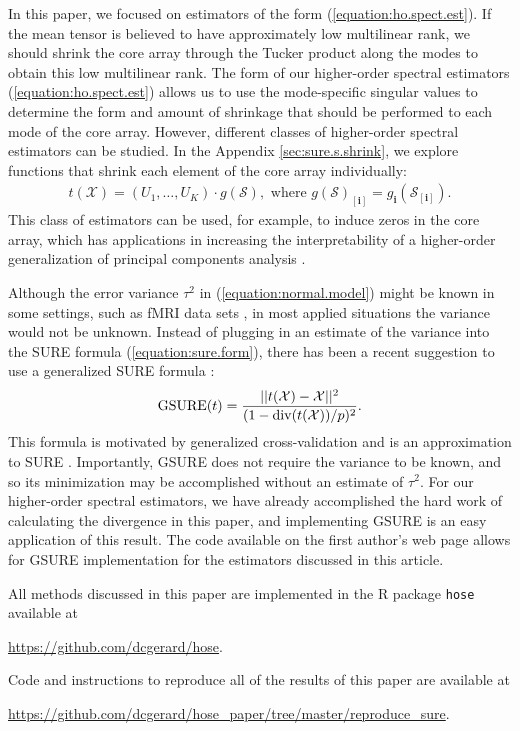 In this paper, we focused on estimators of the form
(\ref{equation:ho.spect.est}). If the mean tensor is believed to have
approximately low multilinear rank, we should shrink the core array
through the Tucker product along the modes to obtain this low
multilinear rank. The form of our higher-order spectral estimators
(\ref{equation:ho.spect.est}) allows us to use the mode-specific
singular values to determine the form and amount of shrinkage that
should be performed to each mode of the core array. However, different
classes of higher-order spectral estimators can be studied. In the
Appendix \ref{sec:sure.s.shrink}, we explore functions that shrink
each element of the core array individually:
\begin{align*}
t(\mathcal{X}) = (U_1,\ldots,U_K)\cdot g(\mathcal{S}), \text{ where } g(\mathcal{S})_{[\mathbf{i}]} = g_{\mathbf{i}}(\mathcal{S}_{[\mathbf{i}]}).
\end{align*}
This class of estimators can be used, for example, to induce zeros in
the core array, which has applications in increasing the
interpretability of a higher-order generalization of principal
components analysis
\citep{henrion1993body,kiers1997uniqueness,murakami1998case,andersson1999general,de2001independent,martin2008jacobi}.

Although the error variance $\tau^2$ in (\ref{equation:normal.model})
might be known in some settings, such as fMRI data sets
\citep{candes2013unbiased}, in most applied situations the variance
would not be unknown. Instead of plugging in an estimate of the
variance into the SURE formula (\ref{equation:sure.form}), there has
been a recent suggestion to use a generalized SURE formula
\citep{sylvain2012smooth,josse2015adaptive}:
\begin{align*}
\operatorname*{GSURE}(t) = \frac{||t(\mathcal{X}) - \mathcal{X}||^2}{(1 - \operatorname*{div}(t(\mathcal{X}))/p)^2}.
\end{align*}
This formula is motivated by generalized cross-validation
\citep{golub1979generalized} and is an approximation to SURE
\citep{josse2015adaptive}. Importantly, GSURE does not require the
variance to be known, and so its minimization may be accomplished
without an estimate of $\tau^2$. For our higher-order spectral
estimators, we have already accomplished the hard work of calculating
the divergence in this paper, and implementing GSURE is an easy
application of this result. The code available on the first author's
web page allows for GSURE implementation for the estimators discussed
in this article.


All methods discussed in this paper are implemented in the R package
\texttt{hose} available at
\begin{center}
  \href{https://github.com/dcgerard/hose}{https://github.com/dcgerard/hose}.
\end{center}
Code and instructions to reproduce all of the results of this paper are available at
\begin{center}
\href{https://github.com/dcgerard/hose\_paper/tree/master/reproduce\_sure}{https://github.com/dcgerard/hose\_paper/tree/master/reproduce\_sure}.
\end{center}